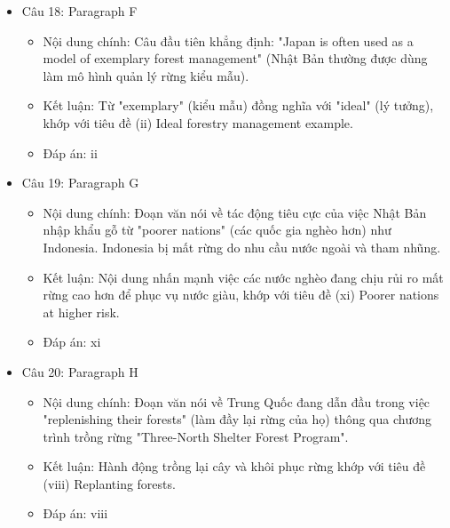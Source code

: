 \documentclass{../templateReading/cdreading}
\begin{document}
\begin{itemize}
\begin{itemize}
\item Đáp án: v
\end{itemize}
\item Câu 18: Paragraph F
\begin{itemize}
\item Nội dung chính: Câu đầu tiên khẳng định: "Japan is often used as a model of exemplary forest management" (Nhật Bản thường được dùng làm mô hình quản lý rừng kiểu mẫu).
\item Kết luận: Từ "exemplary" (kiểu mẫu) đồng nghĩa với "ideal" (lý tưởng), khớp với tiêu đề (ii) Ideal forestry management example.
\item Đáp án: ii
\end{itemize}
\item Câu 19: Paragraph G
\begin{itemize}
\item Nội dung chính: Đoạn văn nói về tác động tiêu cực của việc Nhật Bản nhập khẩu gỗ từ "poorer nations" (các quốc gia nghèo hơn) như Indonesia. Indonesia bị mất rừng do nhu cầu nước ngoài và tham nhũng.
\item Kết luận: Nội dung nhấn mạnh việc các nước nghèo đang chịu rủi ro mất rừng cao hơn để phục vụ nước giàu, khớp với tiêu đề (xi) Poorer nations at higher risk.
\item Đáp án: xi
\end{itemize}
\item Câu 20: Paragraph H
\begin{itemize}
\item Nội dung chính: Đoạn văn nói về Trung Quốc đang dẫn đầu trong việc "replenishing their forests" (làm đầy lại rừng của họ) thông qua chương trình trồng rừng "Three-North Shelter Forest Program".
\item Kết luận: Hành động trồng lại cây và khôi phục rừng khớp với tiêu đề (viii) Replanting forests.
\item Đáp án: viii
\end{itemize}
\end{itemize}



\end{document}
